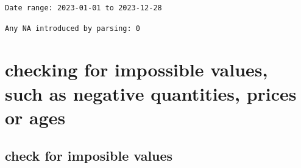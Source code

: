 \documentclass[
]{article}
\newenvironment{Shaded}{\begin{snugshade}}{\end{snugshade}}
\newcommand{\FunctionTok}[1]{\textcolor[rgb]{0.13,0.29,0.53}{\textbf{#1}}}
\newcommand{\NormalTok}[1]{#1}
\newcommand{\SpecialCharTok}[1]{\textcolor[rgb]{0.81,0.36,0.00}{\textbf{#1}}}
\newcommand{\StringTok}[1]{\textcolor[rgb]{0.31,0.60,0.02}{#1}}
\begin{document}
\begin{verbatim}
Date range: 2023-01-01 to 2023-12-28 
\end{verbatim}

\begin{Shaded}
\end{Shaded}

\begin{verbatim}
Any NA introduced by parsing: 0 
\end{verbatim}

\section{checking for impossible values, such as negative quantities,
prices or
ages}\label{checking-for-impossible-values-such-as-negative-quantities-prices-or-ages}

\subsection{check for imposible
values}\label{check-for-imposible-values}
\end{document}
